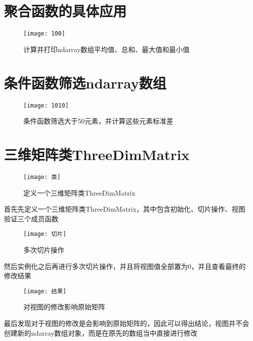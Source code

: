 \documentclass[10pt]{article}
\begin{document}
	
	\section{聚合函数的具体应用}
	\begin{figure}[H]
		\centering
		\texttt{[image: 100]}
		\caption{计算并打印ndarray数组平均值、总和、最大值和最小值}
	\end{figure}
	
	\section{条件函数筛选ndarray数组}
		\begin{figure}[H]
		\centering
		\texttt{[image: 1010]}
		\caption{条件函数筛选大于50元素，并计算这些元素标准差}
	\end{figure}
	
	\section{三维矩阵类ThreeDimMatrix}
	\begin{figure}[H]
		\centering
		\texttt{[image: 类]}
		\caption{定义一个三维矩阵类ThreeDimMatrix}
	\end{figure}
	首先先定义一个三维矩阵类ThreeDimMatrix，其中包含初始化、切片操作、视图验证三个成员函数
	\begin{figure}[H]
		\centering
		\texttt{[image: 切片]}
		\caption{多次切片操作}
	\end{figure}
	然后实例化之后再进行多次切片操作，并且将视图值全部置为0，并且查看最终的修改结果
	\begin{figure}[H]
		\centering
		\texttt{[image: 结果]}
		\caption{对视图的修改影响原始矩阵}
	\end{figure}
	最后发现对于视图的修改是会影响到原始矩阵的，因此可以得出结论，视图并不会创建新的ndarray数组对象，而是在原先的数组当中直接进行修改
\end{document}
